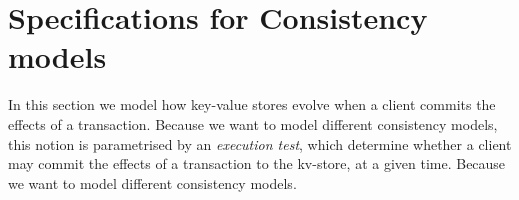 \section{Specifications for Consistency models}
\label{sec:execution-tests}
\label{sec:execution.tests}

In this section we model how key-value stores evolve when a client commits 
the effects of a transaction.
Because we want to model different consistency models, 
this notion is parametrised by an \emph{execution test}, which determine whether 
a client may commit the effects of a transaction to the kv-store, at a given time.
Because we want to model different consistency models.



